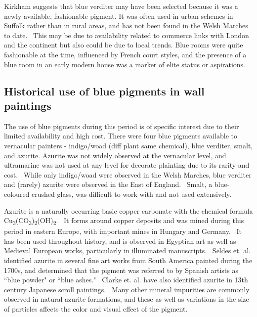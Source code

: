 Kirkham suggests that blue verditer may have been selected because it was a newly available, fashionable pigment. It was often used in urban schemes in Suffolk rather than in rural areas, and has not been found in the Welsh Marches to date.~\autocite{Kirkham_thesis,Baird_thesis} This may be due to availability related to commerce links with London and the continent but also could be due to local trends. Blue rooms were quite fashionable at the time, influenced by French court styles, and the presence of a blue room in an early modern house was a marker of elite status or aspirations.~\autocite{Kirkham_thesis}

\subsection[Historical use of blue pigments in wall paintings]{Historical use of blue pigments in wall paintings}
\label{subsection1.1.3}

The use of blue pigments during this period is of specific interest due to their limited availability and high cost. There were four blue pigments available to vernacular painters - indigo/woad (diff plant same chemical), blue verditer, smalt, and azurite. Azurite was not widely observed at the vernacular level, and ultramarine was not used at any level for decorate plainting due to its rarity and cost.~\autocite{Kirkham_thesis} While only indigo/woad were observed in the Welsh Marches, blue verditer and (rarely) azurite were observed in the East of England.~\autocite{Baird_thesis,Davies_book,Kirkham_thesis} Smalt, a blue-coloured crushed glass, was difficult to work with and not used extensively.~\autocite{Kirkham_thesis}

Azurite is a naturally occurring basic copper carbonate with the chemical formula Cu\textsubscript{3}(CO\textsubscript{3})\textsubscript{2}(OH)\textsubscript{2}.~\autocite{Aru,Smieska} It forms around copper deposits and was mined during this period in eastern Europe, with important mines in Hungary and Germany.~\autocite{Aru} It has been used throughout history, and is observed in Egyptian art as well as Medieval European works, particularly in illuminated manuscripts.~\autocite{Smieska} Seldes et. al. identified azurite in several fine art works from South America painted during the 1700s, and determined that the pigment was referred to by Spanish artists as ``blue powder" or ``blue ashes."~\autocite{Seldes} Clarke et. al. have also identified azurite in 13th century Japanese scroll paintings.~\autocite{Clarke} Many other mineral impurities are commonly observed in natural azurite formations, and these as well as variations in the size of particles affects the color and visual effect of the pigment.~\autocite{Smieska,Price,Cardell}

